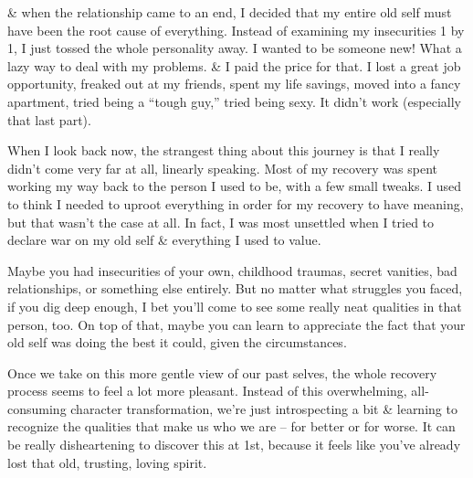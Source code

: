 \documentclass{article}
\numberwithin{equation}{section}
\begin{document}
\& when the relationship came to an end, I decided that my entire old self must have been the root cause of everything. Instead of examining my insecurities 1 by 1, I just tossed the whole personality away. I wanted to be someone new! What a lazy way to deal with my problems. \& I paid the price for that. I lost a great job opportunity, freaked out at my friends, spent my life savings, moved into a fancy apartment, tried being a ``tough guy,'' tried being sexy. It didn't work (especially that last part).

When I look back now, the strangest thing about this journey is that I really didn't come very far at all, linearly speaking. Most of my recovery was spent working my way back to the person I used to be, with a few small tweaks. I used to think I needed to uproot everything in order for my recovery to have meaning, but that wasn't the case at all. In fact, I was most unsettled when I tried to declare war on my old self \& everything I used to value.

Maybe you had insecurities of your own, childhood traumas, secret vanities, bad relationships, or something else entirely. But no matter what struggles you faced, if you dig deep enough, I bet you'll come to see some really neat qualities in that person, too. On top of that, maybe you can learn to appreciate the fact that your old self was doing the best it could, given the circumstances.

Once we take on this more gentle view of our past selves, the whole recovery process seems to feel a lot more pleasant. Instead of this overwhelming, all-consuming character transformation, we're just introspecting a bit \& learning to recognize the qualities that make us who we are -- for better or for worse. It can be really disheartening to discover this at 1st, because it feels like you've already lost that old, trusting, loving spirit.
\end{document}
